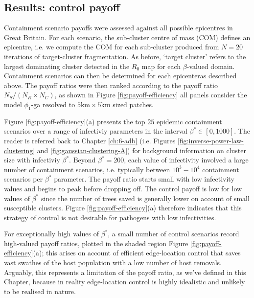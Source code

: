 \newpage

\subsection{Results: control payoff}

Containment scenario payoffs were assessed against all possible epicentres in Great Britain.
For each scenario, the sub-cluster centre of mass (COM) defines an epicentre, i.e. we compute the COM for each sub-cluster produced from $N=20$ iterations of target-cluster fragmentation. 
As before, `target cluster' refers to the largest dominating cluster detected in the $R_0$ map for each $\beta$-valued domain.
Containment scenarios can then be determined for each epicenter\textemdash as described above.
The payoff ratios were then ranked according to the payoff ratio $N_S/ (N_R\times N_C)$, as shown in Figure \ref{fig:payoff-efficiency}\textemdash 
all panels consider the model $\phi_1$-ga resolved to $\mathrm{5 km \times 5 km}$ sized patches.

Figure \ref{fig:payoff-efficiency}(a) presents the top $25$ epidemic containment scenarios over a range of infectiviy parameters in the interval $\beta^* \in [0, 1000]$. 
The reader is referred back to Chapter \ref{ch:6-adb} (i.e. Figures \ref{fig:inverse-power-law-clustering} and \ref{fig:gaussian-clustering-A}) for background information on cluster size with infectiviy $\beta^*$.
Beyond $\beta^*=200$, each value of infectivity involved a large number of containment scenarios, i.e. typically between $10^3-10^4$ containment scenarios per $\beta^*$ parameter.
The payoff ratio starts small with low infectivity values and begins to peak before dropping off. 
The control payoff is low for low values of $\beta^*$ since the number of trees saved is generally lower on account of small susceptible clusters.
Figure \ref{fig:payoff-efficiency}(a) therefore indicates that this strategy of control is not desirable for pathogens with low infectivities.

For exceptionally high values of $\beta^*$, a small number of control scenarios record high-valued payoff ratios, plotted in the shaded region Figure \ref{fig:payoff-efficiency}(a);
this arises on account of efficient edge-location control that saves vast swathes of the host population with a low number of host removals.
Arguably, this represents a limitation of the payoff ratio, as we've defined in this Chapter, because in reality edge-location control is highly idealistic and unlikely to be realised in nature.


